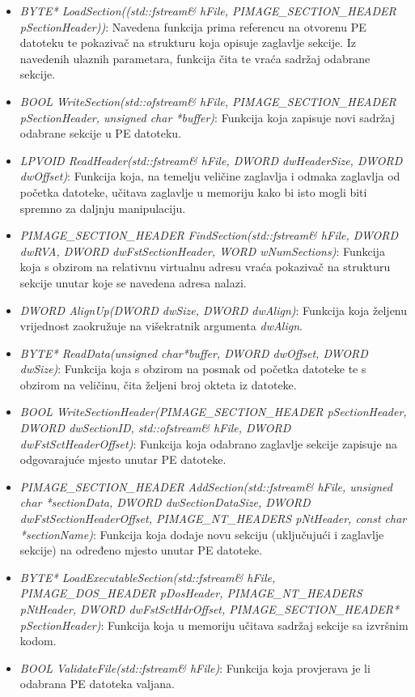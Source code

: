 \documentclass[times, utf8, diplomski, numeric]{fer}
\begin{document}
\begin{itemize}
\item {\footnotesize \emph{BYTE* LoadSection((std::fstream\& hFile, PIMAGE\_SECTION\_HEADER pSectionHeader))}}: Navedena funkcija prima referencu na otvorenu PE datoteku te pokazivač na strukturu koja opisuje zaglavlje sekcije. Iz navedenih ulaznih parametara, funkcija čita te vraća sadržaj odabrane sekcije.
\item {\footnotesize \emph{BOOL WriteSection(std::ofstream\& hFile, PIMAGE\_SECTION\_HEADER pSectionHeader, unsigned char *buffer)}}: Funkcija koja zapisuje novi sadržaj odabrane sekcije u PE datoteku.
\item {\footnotesize \emph{LPVOID ReadHeader(std::fstream\& hFile, DWORD dwHeaderSize, DWORD dwOffset)}}: Funkcija koja, na temelju veličine zaglavlja i odmaka zaglavlja od početka datoteke, učitava zaglavlje u memoriju kako bi isto mogli biti spremno za daljnju manipulaciju.
\item {\footnotesize \emph{PIMAGE\_SECTION\_HEADER FindSection(std::fstream\& hFile, DWORD dwRVA, DWORD dwFstSectionHeader, WORD wNumSections)}}: Funkcija koja s obzirom na relativnu virtualnu adresu vraća pokazivač na strukturu sekcije unutar koje se navedena adresa nalazi.
\item {\footnotesize \emph{DWORD AlignUp(DWORD dwSize, DWORD dwAlign)}}: Funkcija koja željenu vrijednost zaokružuje na višekratnik argumenta \emph{dwAlign}.
\item {\footnotesize \emph{BYTE* ReadData(unsigned char*buffer, DWORD dwOffset, DWORD dwSize)}}: Funkcija koja s obzirom na posmak od početka datoteke te s obzirom na veličinu, čita željeni broj okteta iz datoteke.
\item {\footnotesize \emph{BOOL WriteSectionHeader(PIMAGE\_SECTION\_HEADER pSectionHeader, DWORD dwSectionID, std::ofstream\& hFile, DWORD dwFstSctHeaderOffset)}}: Funkcija koja odabrano zaglavlje sekcije zapisuje na odgovarajuće mjesto unutar PE datoteke.
\item {\footnotesize \emph{PIMAGE\_SECTION\_HEADER AddSection(std::fstream\& hFile, unsigned char *sectionData, DWORD dwSectionDataSize, DWORD dwFstSectionHeaderOffset, PIMAGE\_NT\_HEADERS pNtHeader, const char *sectionName)}}: Funkcija koja dodaje novu sekciju (uključujući i zaglavlje sekcije) na određeno mjesto unutar PE datoteke.
\item {\footnotesize \emph{BYTE* LoadExecutableSection(std::fstream\& hFile, PIMAGE\_DOS\_HEADER pDosHeader, PIMAGE\_NT\_HEADERS pNtHeader, DWORD dwFstSctHdrOffset, PIMAGE\_SECTION\_HEADER* pSectionHeader)}}: Funkcija koja u memoriju učitava sadržaj sekcije sa izvršnim kodom.
\item {\footnotesize \emph{BOOL ValidateFile(std::fstream\& hFile)}}: Funkcija koja provjerava je li odabrana PE datoteka valjana.
\end{itemize}
\end{document}
